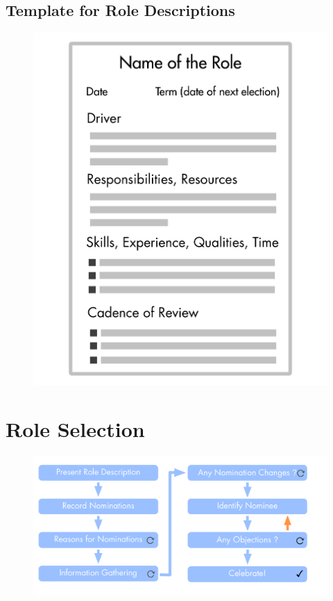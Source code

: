 \subsection{Template for Role Descriptions}
\label{templateforroledescriptions}

\begin{figure}[htbp]
\centering
\includegraphics[keepaspectratio,width=\textwidth,height=0.75\textheight]{img/people-and-roles/role-description-template.png}
\end{figure}

\section{Role Selection}
\label{roleselection}

\begin{figure}[htbp]
\centering
\includegraphics[keepaspectratio,width=\textwidth,height=0.75\textheight]{img/people-and-roles/selection.png}
\end{figure}

